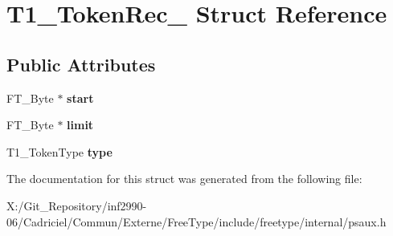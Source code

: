 \hypertarget{struct_t1___token_rec__}{\section{T1\-\_\-\-Token\-Rec\-\_\- Struct Reference}
\label{struct_t1___token_rec__}
}
\subsection*{Public Attributes}
\begin{DoxyCompactItemize}
\item 
\hypertarget{struct_t1___token_rec___a1b365e2910220eabf05f925f45bc98d6}{F\-T\-\_\-\-Byte $\ast$ {\bfseries start}}\label{struct_t1___token_rec___a1b365e2910220eabf05f925f45bc98d6}

\item 
\hypertarget{struct_t1___token_rec___aacd035f0dfbc47b7e1c7eefbe2c2080c}{F\-T\-\_\-\-Byte $\ast$ {\bfseries limit}}\label{struct_t1___token_rec___aacd035f0dfbc47b7e1c7eefbe2c2080c}

\item 
\hypertarget{struct_t1___token_rec___a88b3b889e74609be1827ead4093a2d52}{T1\-\_\-\-Token\-Type {\bfseries type}}\label{struct_t1___token_rec___a88b3b889e74609be1827ead4093a2d52}

\end{DoxyCompactItemize}


The documentation for this struct was generated from the following file\-:\begin{DoxyCompactItemize}
\item 
X\-:/\-Git\-\_\-\-Repository/inf2990-\/06/\-Cadriciel/\-Commun/\-Externe/\-Free\-Type/include/freetype/internal/psaux.\-h\end{DoxyCompactItemize}
